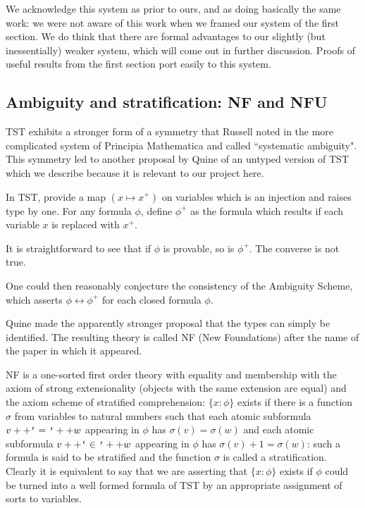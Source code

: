 \documentclass[12pt]{article}
\begin{document}
We acknowledge this system as prior to ours, and as doing basically the same work:  we were not aware of this work when we framed our system of the first section.  We do think that there are formal advantages to our slightly (but inessentially) weaker system, which will come out in further discussion.  Proofs of useful results from the first section port easily to this system.


\subsection{Ambiguity and stratification:  NF and NFU}

TST exhibits a stronger form of a symmetry that Russell noted in the more complicated system of
Principia Mathematica and called ``systematic ambiguity".  This symmetry led to another proposal by Quine of an untyped version of TST which we describe because it is relevant to our project here.

In TST, provide a map $(x \mapsto x^+)$ on variables which is an injection and raises type by one.
For any formula $\phi$, define $\phi^+$ as the formula which results if each variable $x$ is replaced with $x^+$.

It is straightforward to see that if $\phi$ is provable, so is $\phi^+$.  The converse is not true.

One could then reasonably conjecture the consistency of the Ambiguity Scheme, which asserts
$\phi \leftrightarrow \phi^+$ for each closed formula $\phi$.

Quine made the apparently stronger proposal that the types can simply be identified.  The resulting theory is called NF (New Foundations) after the name of the paper in which it appeared.

NF is a one-sorted first order theory with equality and membership with the axiom of strong extensionality
(objects with the same extension are equal) and the axiom scheme of stratified comprehension:  $\{x:\phi\}$ exists if there is a function $\sigma$ from variables to natural numbers such that each atomic subformula
$v++\verb|`|=\verb|'|++w$ appearing in $\phi$ has $\sigma(v)=\sigma(w)$ and each atomic subformula
$v++\verb|`|\in\verb|'|++w$ appearing in $\phi$ has $\sigma(v)+1=\sigma(w)$: such a formula is said to be stratified and the function $\sigma$ is called a stratification.  Clearly it is equivalent to say that we are asserting that $\{x:\phi\}$ exists if $\phi$ could be turned into a well formed formula of TST by an appropriate assignment of sorts to variables.
\end{document}
